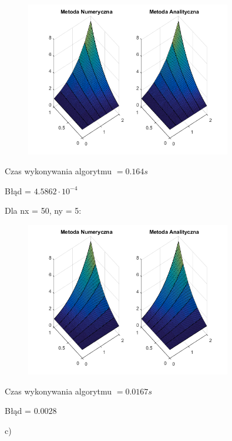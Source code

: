 \begin{figure}[!ht]
	\begin{center}
		\includegraphics[width=0.8\textwidth]{Lab5/charts/zad2/5x50.png}
	\end{center}
\end{figure}

Czas wykonywania algorytmu $ = 0.164 s$

Błąd = $4.5862\cdot 10^{-4}$

Dla nx = 50, ny = 5:

\begin{figure}[!ht]
	\begin{center}
		\includegraphics[width=0.8\textwidth]{Lab5/charts/zad2/50x5.png}
	\end{center}
\end{figure}

Czas wykonywania algorytmu $ = 0.0167 s$

Błąd = $0.0028$

\newpage

c)

